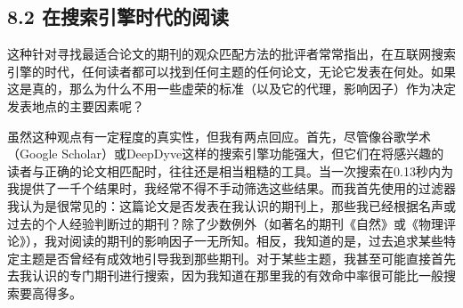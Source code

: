 \subsection*{8.2 在搜索引擎时代的阅读}
这种针对寻找最适合论文的期刊的观众匹配方法的批评者常常指出，在互联网搜索引擎的时代，任何读者都可以找到任何主题的任何论文，无论它发表在何处。如果这是真的，那么为什么不用一些虚荣的标准（以及它的代理，影响因子）作为决定发表地点的主要因素呢？

虽然这种观点有一定程度的真实性，但我有两点回应。首先，尽管像谷歌学术（Google Scholar）或DeepDyve这样的搜索引擎功能强大，但它们在将感兴趣的读者与正确的论文相匹配时，往往还是相当粗糙的工具。当一次搜索在0.13秒内为我提供了一千个结果时，我经常不得不手动筛选这些结果。而我首先使用的过滤器我认为是很常见的：这篇论文是否发表在我认识的期刊上，那些我已经根据名声或过去的个人经验判断过的期刊？除了少数例外（如著名的期刊《自然》或《物理评论》），我对阅读的期刊的影响因子一无所知。相反，我知道的是，过去追求某些特定主题是否曾经有成效地引导我到那些期刊。对于某些主题，我甚至可能直接首先去我认识的专门期刊进行搜索，因为我知道在那里我的有效命中率很可能比一般搜索要高得多。

